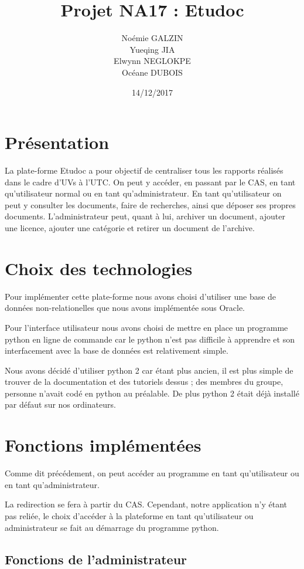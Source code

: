 \documentclass[11pt]{report}
\title{\textbf{Projet NA17 : Etudoc}}
\author{Noémie GALZIN \\
		Yueqing JIA \\
		Elwynn NEGLOKPE\\
		Océane DUBOIS}
\date{14/12/2017}
\begin{document}
\maketitle
\newpage
\section{Présentation}
La plate-forme Etudoc a pour objectif de centraliser tous les rapports réalisés dans le cadre d'UVs à l'UTC. On peut y accéder, en passant par le CAS, en tant qu'utilisateur normal ou en tant qu'administrateur. 
En tant qu'utilisateur on peut y consulter les documents, faire de recherches, ainsi que déposer ses propres documents. 
L'administrateur peut, quant à lui, archiver un document, ajouter une licence, ajouter une catégorie et retirer un document de l'archive.

\section{Choix des technologies}
Pour implémenter cette plate-forme nous avons choisi d'utiliser une base de données non-relationelles que nous avons implémentée sous Oracle. 

Pour l'interface utilisateur nous avons choisi de mettre en place un programme python en ligne de commande car le python n'est pas difficile à apprendre et son interfacement avec la base de données est relativement simple.

Nous avons décidé d'utiliser python 2 car étant plus ancien, il est plus simple de trouver de la documentation et des tutoriels dessus ; des membres du groupe, personne n'avait codé en python au préalable. De plus python 2 était déjà installé par défaut sur nos ordinateurs.

\section{Fonctions implémentées}

Comme dit précédement, on peut accéder au programme en tant qu'utilisateur ou en tant qu'administrateur.

La redirection se fera à partir du CAS. Cependant, notre application n'y étant pas reliée, le choix d'accéder à la plateforme en tant qu'utilisateur ou administrateur se fait au démarrage du programme python.

\subsection{Fonctions de l'administrateur}
\end{document}

